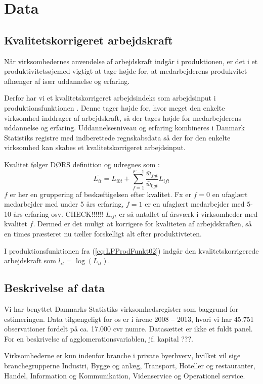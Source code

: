 \section{Data}
\subsection{Kvalitetskorrigeret arbejdskraft}
Når virksomhedernes anvendelse af arbejdskraft indgår i produktionen, er det i et produktivitetsøjemed vigtigt at tage højde for, at medarbejderens produkvitet afhænger af især uddannelse og erfaring.

Derfor har vi et kvalitetskorrigeret arbejdsindeks som arbejdsinput i produktionsfunktionen \cite[s. 5]{dors2010baggrund}. Denne tager højde for, hvor meget den enkelte virksomhed inddrager af arbejdskraft, så der tages højde for medarbejderens uddannelse og erfaring. Uddannelsesniveau og erfaring kombineres i Danmark Statistiks registre med indberettede regnskabsdata så der for den enkelte virksomhed kan skabes et kvalitetskorrigeret arbejdsinput.

Kvalitet følger DØRS definition og udregnes som \cite[s. 5]{dors2010baggrund}:
\begin{equation}
	\bar{L_{it}} = 
	L_{i0t} + \sum_{f=1}^{F-1} \frac{\bar{w}_{fgt}}{\bar{w}_{0gt}} 
	L_{ift}
\end{equation}
$f$ er her en gruppering af beskæftigelsen efter kvalitet. Fx er $f=0$ en ufaglært medarbejder med under 5 års erfaring, $f=1$ er en ufaglært medarbejder med 5-10 års erfaring osv. CHECK!!!!!!
$L_{ift}$ er så antallet af årsværk i virksomheder med kvalitet $f$. Dermed er det muligt at korrigere for kvaliteten af arbejdskraften, så en times præsteret nu tæller forskelligt alt efter produktivteten.

I produktionsfunktionen fra (\ref{eq:LPProdFunkt02}) indgår den kvalitetskorrigerede arbejdskraft som $l_{it} = \log(L_{it})$.  

\subsection{Beskrivelse af data}
Vi har benyttet Danmarks Statistiks virksomhedsregister som baggrund for estimeringen. Data tilgængeligt for os er i årene 2008 -- 2013, hvori vi har 45.751 observationer fordelt på ca. 17.000 cvr numre. Datasættet er ikke et fuldt panel. For en beskrivelse af agglomerationsvariablen, jf. kapital ???.

Virksomhederne er kun indenfor branche i private byerhverv, hvilket vil sige branchegrupperne Industri, Bygge og anlæg, Transport, Hoteller og restauranter, Handel, Information og Kommunikation, Videnservice og Operationel service.

